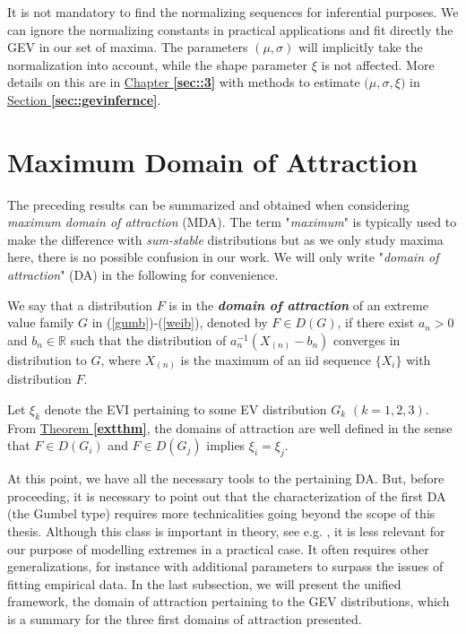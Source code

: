 It is not mandatory to find the normalizing sequences for inferential purposes.
We can ignore the normalizing constants in practical applications and fit directly the GEV in our set of maxima.
The parameters $(\mu,\sigma)$ will implicitly take the normalization into account, while the shape parameter $\xi$ is not affected. More details on this are in \hyperref[sec::3]{Chapter \textbf{\ref{sec::3}}} with methods to estimate $\big( \mu, \sigma,\xi\big)$ in \hyperref[sec::gevinfernce]{ Section \textbf{\ref{sec::gevinfernce}}}.

\section{Maximum Domain of Attraction}\label{sec:mda}

The preceding results can be summarized and obtained when considering \emph{maximum domain of attraction} (MDA). The term "\emph{maximum}" is typically used to make the difference with \emph{sum-stable} distributions but as we only study maxima here, there is no possible confusion in our work. We will only write "\emph{domain of attraction}" (DA) in the following for convenience.

\begin{definition} We say that a distribution $F$ is in the \emph{\textbf{domain of attraction}} of an extreme value family $G$ in (\ref{gumb})-(\ref{weib}), denoted by $F\in D(G)$, if there exist $a_n>0$ and $b_n\in\mathbb{R}$ such that the distribution of $a_n^{-1}(X_{(n)}-b_n)$ converges in distribution to $G$, where $X_{(n)}$ is the maximum of an iid sequence $\{X_i\}$ with distribution $F$. %
\end{definition}
Let $\xi_k$ denote the EVI pertaining to some EV distribution $G_k$ $(k=1,2,3)$. From \hyperref[extthm]{Theorem \textbf{\ref{extthm}}}, the domains of attraction are well defined in the sense that $F\in D(G_i)$ and $F\in D(G_j)$ implies $\xi_i=\xi_j$.


At this point, we have all the necessary tools to the pertaining DA. But, before proceeding, it is necessary to point out that the characterization of the first DA (the Gumbel type) requires more technicalities going beyond the scope of this thesis. Although this class is important in theory, see e.g. \cite{pinheiro_comparative_2015}, it is less relevant for our purpose of modelling extremes in a practical case. It often requires other generalizations, for instance with additional parameters to surpass the issues of fitting empirical data. In the last subsection, we will present the unified framework, the domain of attraction pertaining to the GEV distributions, which is a summary for the three first domains of attraction presented.


